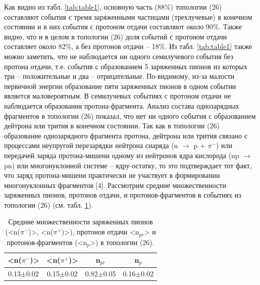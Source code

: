 \documentclass[fontsize=14pt]{scrarticle}
\begin{document}
Как видно из табл. \ref{tab:table1}, основную часть (88\%) топологии (26) составляют события с тремя заряженными частицами (трехлучевые) в конечном состоянии и в них события с протоном отдачи составляют около 90\%. Также видно, что и в целом в топологии (26) доля событий с протоном отдачи составляет около 82\%, а без протонов отдачи – 18\%. Из табл. \ref{tab:table1} также можно заметить, что не наблюдается ни одного семилучевого события без протона отдачи, т.е. события с образованием 5 заряженных пионов из которых три – положительные и два – отрицательные. По-видимому, из-за малости первичной энергии образование пяти заряженных пионов в одном событии является маловероятным. В семилучевых событиях с протоном отдачи не наблюдается образования протона-фрагмента. Анализ состава однозарядных фрагментов в топологии (26) показал, что нет ни одного события с образованием дейтрона или трития в конечном состоянии. Так как в топологии (26) образование однозарядного фрагмента протона, дейтрона или трития связано с процессами неупругой перезарядки нейтрона снаряда (n $\rightarrow$ p + $\pi^{-}$) или передачей заряда протона-мишени одному из нейтронов ядра кислорода (np $\rightarrow$ pn) или многонуклонной системе – ядру-остатку, то это подтверждает тот факт, что заряд протона-мишени практически не участвует в формировании многонуклонных фрагментов [4]. Рассмотрим средние множественности заряженных пионов, протонов отдачи, и протонов-фрагментов в событиях из топологии (26) (см. табл. \ref{tab:table2}).


\begin{table}
    \centering
    \begin{tabular}{|c|c|c|c|}
    \hline
       <n($\pi^{-}$)>  &<n($\pi^{+}$)> &n$_{pr}$&n$_{p}$ \\
       \hline
         0.13$\pm$0.02&	0.15$\pm$0.02&	0.82$\pm$0.05&	0.16$\pm$0.02\\
         \hline
    \end{tabular}
    \caption{Средние множественности заряженных пионов (<n($\pi^{-}$)>, <n($\pi^{+}$)>), протонов отдачи <n$_{pr}$> и протонов-фрагментов (<n$_{p}$>) в топологии (26).}
    \label{tab:table2}
\end{table}
\end{document}
